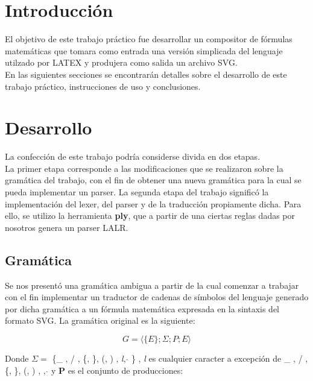 \section{Introducción}

\indent \indent El objetivo de este trabajo práctico fue desarrollar un compositor de fórmulas matemáticas que tomara como entrada una versión simplicada del lenguaje utilzado por LATEX y produjera como salida un archivo SVG.\\
\indent \indent En las siguientes secciones se encontrarán detalles sobre el desarrollo de este trabajo práctico, instrucciones de uso y conclusiones.\\

\newpage

\section{Desarrollo}

\indent \indent La confección de este trabajo podría considerse divida en dos etapas. \\
\indent La primer etapa corresponde a las modificaciones que se realizaron sobre la gramática del trabajo, con el fin de obtener una nueva gramática para la cual se pueda implementar un parser.
\indent La segunda etapa del trabajo significó la implementación del lexer, del parser y de la traducción propiamente dicha. Para ello, se utilizo la herramienta \textbf{ply}, que a partir de una ciertas reglas dadas por nosotros genera un parser LALR.\\

\subsection{Gramática}

\indent Se nos presentó una gramática ambigua a partir de la cual comenzar a trabajar con el fin implementar un traductor de cadenas de símbolos del lenguaje generado por dicha gramática a un fórmula matemática expresada en la sintaxis del formato SVG.
\indent La gramática original es la siguiente:

 \begin{equation}
    G = \langle \{ E\};\Sigma;P;E \rangle
 \end{equation}

\indent Donde $\Sigma = $ \{\_ , / , \{, \}, (, ) , \textit{l}, $\hat{}$ \} , \textit{l} es cualquier caracter a excepción de \_ , / , \{, \}, (, ) , , $\hat{}$  y \textbf{P} es el conjunto de producciones:


